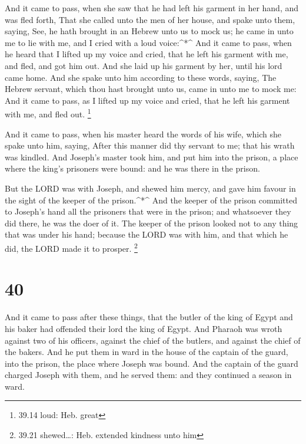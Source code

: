  And it came to pass, when she saw that he had left his
garment in her hand, and was fled forth,  That she called
unto the men of her house, and spake unto them, saying, See, he hath
brought in an Hebrew unto us to mock us; he came in unto me to lie with
me, and I cried with a loud voice:\^{}*\^{}  And it came to
pass, when he heard that I lifted up my voice and cried, that he left
his garment with me, and fled, and got him out.  And she
laid up his garment by her, until his lord came home.  And
she spake unto him according to these words, saying, The Hebrew servant,
which thou hast brought unto us, came in unto me to mock me:
 And it came to pass, as I lifted up my voice and cried,
that he left his garment with me, and fled out. \footnote{39.14 loud:
  Heb. great}

 And it came to pass, when his master heard the words of
his wife, which she spake unto him, saying, After this manner did thy
servant to me; that his wrath was kindled.  And Joseph's
master took him, and put him into the prison, a place where the king's
prisoners were bound: and he was there in the prison.

 But the LORD was with Joseph, and shewed him mercy, and
gave him favour in the sight of the keeper of the prison.\^{}*\^{}
 And the keeper of the prison committed to Joseph's hand
all the prisoners that were in the prison; and whatsoever they did
there, he was the doer of it.  The keeper of the prison
looked not to any thing that was under his hand; because the LORD was
with him, and that which he did, the LORD made it to prosper.
\footnote{39.21 shewed\ldots: Heb. extended kindness unto him}

\hypertarget{section-39}{%
\section{40}\label{section-39}}

 And it came to pass after these things, that the butler of
the king of Egypt and his baker had offended their lord the king of
Egypt.  And Pharaoh was wroth against two of his officers,
against the chief of the butlers, and against the chief of the bakers.
 And he put them in ward in the house of the captain of the
guard, into the prison, the place where Joseph was bound. 
And the captain of the guard charged Joseph with them, and he served
them: and they continued a season in ward.


